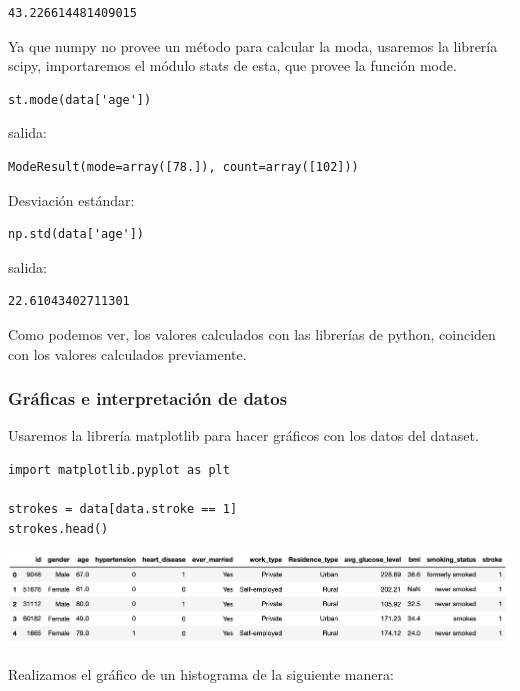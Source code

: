 \documentclass[letter]{article}
\begin{document}
\begin{verbatim}
43.226614481409015
\end{verbatim}

Ya que numpy no provee un método para calcular la moda, usaremos la librería scipy, importaremos el módulo stats de esta, que provee la función mode.

\begin{verbatim}
st.mode(data['age'])
\end{verbatim}

salida:

\begin{verbatim}
ModeResult(mode=array([78.]), count=array([102]))
\end{verbatim}

Desviación estándar:

\begin{verbatim}
np.std(data['age'])
\end{verbatim}

salida:

\begin{verbatim}
22.61043402711301
\end{verbatim}

Como podemos ver, los valores calculados con las librerías de python, coinciden con los valores calculados previamente.

\subsubsection{Gráficas e interpretación de datos}
\label{sec:orga099a90}

Usaremos la librería matplotlib para hacer gráficos con los datos del dataset.

\begin{verbatim}
import matplotlib.pyplot as plt

strokes = data[data.stroke == 1]
strokes.head()
\end{verbatim}

\begin{center}
\includegraphics[width=.9\linewidth]{./img/tabla.png}
\end{center}

Realizamos el gráfico de un histograma de la siguiente manera:
\end{document}
